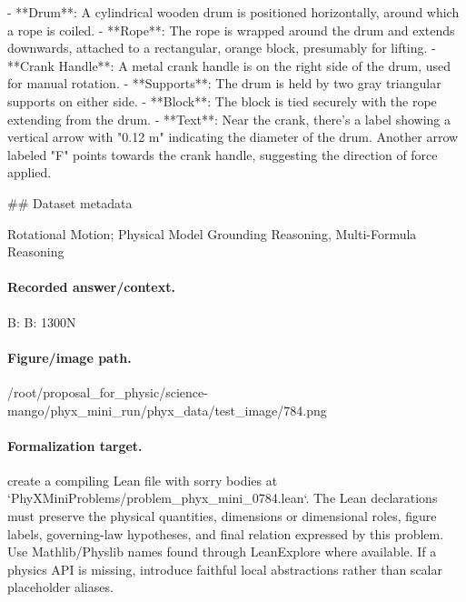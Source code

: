 - **Drum**: A cylindrical wooden drum is positioned horizontally, around which a rope is coiled.
- **Rope**: The rope is wrapped around the drum and extends downwards, attached to a rectangular, orange block, presumably for lifting.
- **Crank Handle**: A metal crank handle is on the right side of the drum, used for manual rotation.
- **Supports**: The drum is held by two gray triangular supports on either side.
- **Block**: The block is tied securely with the rope extending from the drum.
- **Text**: Near the crank, there's a label showing a vertical arrow with "0.12 m" indicating the diameter of the drum. Another arrow labeled "F" points towards the crank handle, suggesting the direction of force applied.

\#\# Dataset metadata

Rotational Motion; Physical Model Grounding Reasoning, Multi-Formula Reasoning

\paragraph{Recorded answer/context.}
B: B: 1300N

\paragraph{Figure/image path.}
/root/proposal\_for\_physic/science-mango/phyx\_mini\_run/phyx\_data/test\_image/784.png

\paragraph{Formalization target.}
create a compiling Lean file with sorry bodies at `PhyXMiniProblems/problem\_phyx\_mini\_0784.lean`. The Lean declarations must preserve the physical quantities, dimensions or dimensional roles, figure labels, governing-law hypotheses, and final relation expressed by this problem.
Use Mathlib/Physlib names found through LeanExplore where available. If a physics API is missing, introduce faithful local abstractions rather than scalar placeholder aliases.

